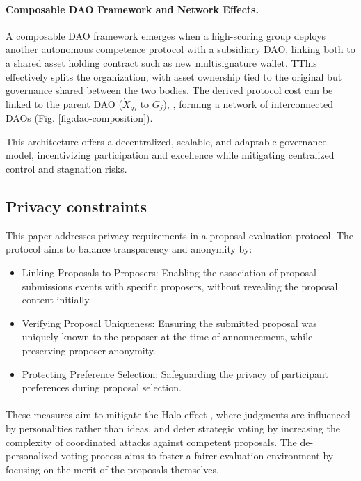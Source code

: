 \documentclass{article}
\begin{document}
\begin{CJK}{UTF8}{gbsn}
\begin{multicols}{2}
            \paragraph{Composable DAO Framework and Network Effects.}
            A composable DAO framework emerges when a high-scoring group deploys another autonomous competence protocol with a subsidiary DAO, linking both to a shared asset holding contract such as new multisignature wallet. TThis effectively splits the organization, with asset ownership tied to the original but governance shared between the two bodies. The derived protocol cost can be linked to the parent DAO ($ \grave{X}_{gj}$ to $G_j$), , forming a network of interconnected DAOs (Fig. \ref{fig:dao-composition}).

            

            This architecture offers a decentralized, scalable, and adaptable governance model, incentivizing participation and excellence while mitigating centralized control and stagnation risks.


            \subsection{Privacy constraints}

            This paper addresses privacy requirements in a proposal evaluation protocol. The protocol aims to balance transparency and anonymity by:
            \begin{itemize}
                \item Linking Proposals to Proposers: Enabling the association of proposal submissions events with specific proposers, without revealing the proposal content initially.
                \item Verifying Proposal Uniqueness: Ensuring the submitted proposal was uniquely known to the proposer at the time of announcement, while preserving proposer anonymity.
                \item Protecting Preference Selection: Safeguarding the privacy of participant preferences during proposal selection.

            \end{itemize}
            \paragraph{}

            These measures aim to mitigate the Halo effect \cite{Verhulst2010}, where judgments are influenced by personalities rather than ideas, and deter strategic voting by increasing the complexity of coordinated attacks against competent proposals. The de-personalized voting process aims to foster a fairer evaluation environment by focusing on the merit of the proposals themselves.


\end{multicols}
\end{CJK}
\end{document}
